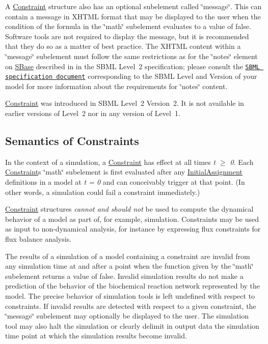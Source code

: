 A \hyperlink{class_constraint}{Constraint} structure also has an optional subelement called \char`\"{}message\char`\"{}. This can contain a message in X\+H\+T\+ML format that may be displayed to the user when the condition of the formula in the \char`\"{}math\char`\"{} subelement evaluates to a value of {\ttfamily false}. Software tools are not required to display the message, but it is recommended that they do so as a matter of best practice. The X\+H\+T\+ML content within a \char`\"{}message\char`\"{} subelement must follow the same restrictions as for the \char`\"{}notes\char`\"{} element on \hyperlink{class_s_base}{S\+Base} described in in the S\+B\+ML Level~2 specification; please consult the \href{http://sbml.org/Documents/Specifications}{\tt S\+B\+ML specification document} corresponding to the S\+B\+ML Level and Version of your model for more information about the requirements for \char`\"{}notes\char`\"{} content.

\hyperlink{class_constraint}{Constraint} was introduced in S\+B\+ML Level~2 Version~2. It is not available in earlier versions of Level~2 nor in any version of Level~1.\hypertarget{class_constraint_constraint-semantics}{}\subsection{Semantics of Constraints}\label{class_constraint_constraint-semantics}
In the context of a simulation, a \hyperlink{class_constraint}{Constraint} has effect at all times {\itshape t $\geq$ 0}. Each \hyperlink{class_constraint}{Constraint}\textquotesingle{}s \char`\"{}math\char`\"{} subelement is first evaluated after any \hyperlink{class_initial_assignment}{Initial\+Assignment} definitions in a model at {\itshape t = 0} and can conceivably trigger at that point. (In other words, a simulation could fail a constraint immediately.)

\hyperlink{class_constraint}{Constraint} structures {\itshape cannot and should not} be used to compute the dynamical behavior of a model as part of, for example, simulation. Constraints may be used as input to non-\/dynamical analysis, for instance by expressing flux constraints for flux balance analysis.

The results of a simulation of a model containing a constraint are invalid from any simulation time at and after a point when the function given by the \char`\"{}math\char`\"{} subelement returns a value of {\ttfamily false}. Invalid simulation results do not make a prediction of the behavior of the biochemical reaction network represented by the model. The precise behavior of simulation tools is left undefined with respect to constraints. If invalid results are detected with respect to a given constraint, the \char`\"{}message\char`\"{} subelement may optionally be displayed to the user. The simulation tool may also halt the simulation or clearly delimit in output data the simulation time point at which the simulation results become invalid.

